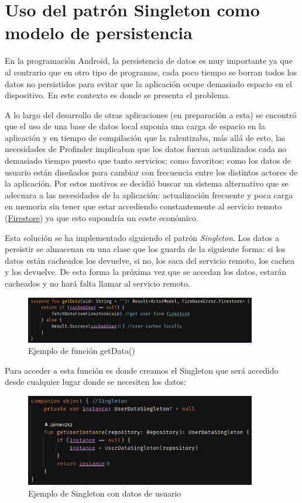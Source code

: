 \section{Uso del patrón Singleton como modelo de persistencia}
En la programación Android, la persistencia de datos es muy importante ya que al contrario que en otro tipo de programas, cada poco tiempo se borran todos los datos no persistidos para evitar que la aplicación ocupe demasiado espacio en el dispositivo. En este contexto es donde se presenta el problema.

A lo largo del desarrollo de otras aplicaciones (en preparación a esta) se encontró que el uso de una base de datos local suponía una carga de espacio en la aplicación y en tiempo de compilación que la ralentizaba, más allá de esto, las necesidades de Profinder implicaban que los datos fueran actualizados cada no demasiado tiempo puesto que tanto servicios; como favoritos; como los datos de usuario están diseñados para cambiar con frecuencia entre los distintos actores de la aplicación. Por estos motivos se decidió buscar un sistema alternativo que se adecuara a las necesidades de la aplicación: actualización frecuente y poca carga en memoria sin tener que estar accediendo constantemente al servicio remoto (\hyperlink{subsec:firestore}{Firestore}) ya que esto supondría un coste económico.

Esta solución se ha implementado siguiendo el patrón \textit{Singleton}. Los datos a persistir se almacenan en una clase que los guarda de la siguiente forma: si los datos están cacheados los devuelve, si no, los saca del servicio remoto, los cachea y los devuelve. De esta forma la próxima vez que se accedan los datos, estarán cacheados y no hará falta llamar al servicio remoto.
\begin{figure}[h]
    \centering
    \includegraphics[width = 0.9\textwidth]{Imagenes/Fuentes/ejemplo_singleton1.png}
    \caption{Ejemplo de función getData()}
    \label{fig:ejemplo_singleton1}
\end{figure}

Para acceder a esta función es donde creamos el Singleton que será accedido desde cualquier lugar donde se necesiten los datos:
\begin{figure}[h]
    \centering
    \includegraphics[width = 0.9\textwidth]{Imagenes/Fuentes/ejemplo_singleton2.png}
    \caption{Ejemplo de Singleton con datos de usuario}
    \label{fig:ejemplo_singleton2}
\end{figure}